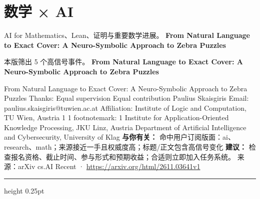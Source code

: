 \documentclass[10.5pt]{ctexart}
\begin{document}
\section*{数学 × AI}
{\color{ormuted} AI for Mathematics、Lean、证明与重要数学进展。}
\vspace{2mm}
{\LARGE\bfseries From Natural Language to Exact Cover: A Neuro-Symbolic Approach to Zebra Puzzles}\par
\vspace{1mm}
{\color{ormuted} 本版筛出 5 个高信号事件。}
\vspace{3mm}
{\Large\bfseries From Natural Language to Exact Cover: A Neuro-Symbolic Approach to Zebra Puzzles}\par
From Natural Language to Exact Cover: A Neuro-Symbolic Approach to Zebra Puzzles Thanks: Equal supervision Equal contribution Paulius Skaisgiris Email: paulius.skaisgiris@tuwien.ac.at Affiliation: Institute of Logic and Computation, TU Wien, Austria 1 1 footnotemark: 1 Institute for Application-Oriented Knowledge Processing, JKU Linz, Austria Department of Artificial Intelligence and Cybersecurity, University of Klag
\textbf{与你有关：} 命中用户订阅版面：ai、research、math；来源接近一手且权威度高；标题/正文包含高信号变化
\textbf{建议：} 检查报名资格、截止时间、参与形式和预期收益；合适则立即加入任务系统。
{\footnotesize\color{ormuted} 来源：arXiv cs.AI Recent · \url{https://arxiv.org/html/2611.03641v1}}
\vspace{4mm}
\hrule height 0.25pt
\vspace{3mm}
\end{document}
